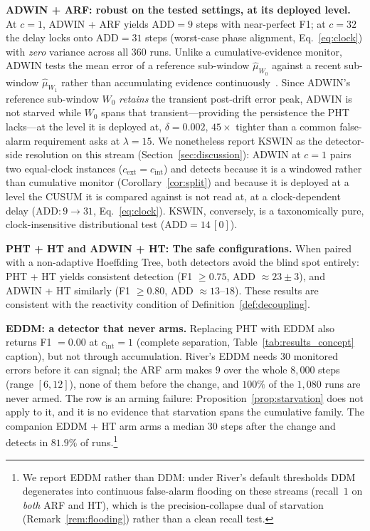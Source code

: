 \documentclass[smallextended]{svjour3}
\begin{document}
\textbf{ADWIN + ARF: robust on the tested settings, at its deployed level.}
At $c = 1$, ADWIN + ARF yields $\mathrm{ADD} = 9$ steps with near-perfect F1; at $c = 32$ the delay locks onto $\mathrm{ADD} = 31$ steps (worst-case phase alignment, Eq.~\eqref{eq:clock}) with \emph{zero} variance across all 360 runs.
Unlike a cumulative-evidence monitor, ADWIN tests the mean error of a reference sub-window $\hat{\mu}_{W_0}$ against a recent sub-window $\hat{\mu}_{W_1}$ rather than accumulating evidence continuously~\cite{bifet_adwin_2007}.
Since ADWIN's reference sub-window $W_0$ \emph{retains} the transient post-drift error peak, ADWIN is not starved while $W_0$ spans that transient---providing the persistence the PHT lacks---at the level it is deployed at, $\delta = 0.002$, $45\times$ tighter than a common false-alarm requirement asks at $\lambda = 15$.
We nonetheless report KSWIN as the detector-side resolution on this stream (Section~\ref{sec:discussion}): ADWIN at $c = 1$ pairs two equal-clock instances ($c_{\mathrm{ext}} = c_{\mathrm{int}}$) and detects because it is a windowed rather than cumulative monitor (Corollary~\ref{cor:split}) and because it is deployed at a level the CUSUM it is compared against is not read at, at a clock-dependent delay ($\mathrm{ADD}: 9 \to 31$, Eq.~\eqref{eq:clock}). KSWIN, conversely, is a taxonomically pure, clock-insensitive distributional test ($\mathrm{ADD} = 14\,[0]$).

\textbf{PHT + HT and ADWIN + HT: The safe configurations.}
When paired with a non-adaptive Hoeffding Tree, both detectors avoid the blind spot entirely: PHT + HT yields consistent detection (F1 $\ge 0.75$, ADD $\approx 23 \pm 3$), and ADWIN + HT similarly (F1 $\ge 0.80$, ADD $\approx 13$--$18$).
These results are consistent with the reactivity condition of Definition~\ref{def:decoupling}.

\textbf{EDDM: a detector that never arms.}
Replacing PHT with EDDM also returns F1 $= 0.00$ at $c_{\mathrm{int}} = 1$ (complete separation, Table~\ref{tab:results_concept} caption), but not through accumulation. River's EDDM needs $30$ monitored errors before it can signal; the ARF arm makes $9$ over the whole $8{,}000$ steps (range $[6, 12]$), none of them before the change, and $100\%$ of the $1{,}080$ runs are never armed. The row is an arming failure: Proposition~\ref{prop:starvation} does not apply to it, and it is no evidence that starvation spans the cumulative family. The companion EDDM + HT arm arms a median $30$ steps after the change and detects in $81.9\%$ of runs.\footnote{We report EDDM rather than DDM: under River's default thresholds DDM degenerates into continuous false-alarm flooding on these streams (recall~$1$ on \emph{both} ARF and HT), which is the precision-collapse dual of starvation (Remark~\ref{rem:flooding}) rather than a clean recall test.}
\end{document}
